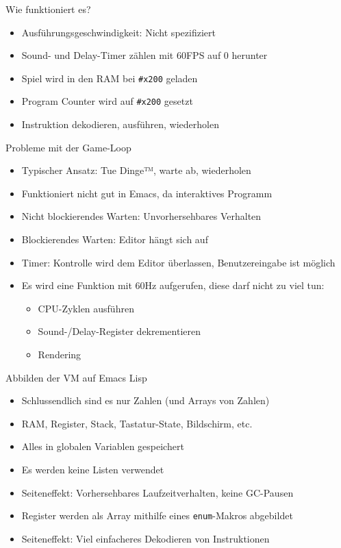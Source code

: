 \documentclass[presentation]{beamer}
\begin{document}
\begin{frame}[fragile,label={sec:org151a83f}]{Wie funktioniert es?}
 \begin{itemize}
\item Ausführungsgeschwindigkeit: Nicht spezifiziert
\item Sound- und Delay-Timer zählen mit 60FPS auf 0 herunter
\item Spiel wird in den RAM bei \texttt{\#x200} geladen
\item Program Counter wird auf \texttt{\#x200} gesetzt
\item Instruktion dekodieren, ausführen, wiederholen
\end{itemize}
\end{frame}

\begin{frame}[label={sec:org61d7d58}]{Probleme mit der Game-Loop}
\begin{itemize}
\item Typischer Ansatz: Tue Dinge™, warte ab, wiederholen
\item Funktioniert nicht gut in Emacs, da interaktives Programm
\item Nicht blockierendes Warten: Unvorhersehbares Verhalten
\item Blockierendes Warten: Editor hängt sich auf
\item Timer: Kontrolle wird dem Editor überlassen, Benutzereingabe ist
möglich
\item Es wird eine Funktion mit 60Hz aufgerufen, diese darf nicht zu viel
tun:
\begin{itemize}
\item CPU-Zyklen ausführen
\item Sound-/Delay-Register dekrementieren
\item Rendering
\end{itemize}
\end{itemize}
\end{frame}

\begin{frame}[fragile,label={sec:org0c14eb9}]{Abbilden der VM auf Emacs Lisp}
 \begin{itemize}
\item Schlussendlich sind es nur Zahlen (und Arrays von Zahlen)
\item RAM, Register, Stack, Tastatur-State, Bildschirm, etc.
\item Alles in globalen Variablen gespeichert
\item Es werden keine Listen verwendet
\item Seiteneffekt: Vorhersehbares Laufzeitverhalten, keine GC-Pausen
\item Register werden als Array mithilfe eines \texttt{enum}-Makros abgebildet
\item Seiteneffekt: Viel einfacheres Dekodieren von Instruktionen
\end{itemize}
\end{frame}
\end{document}
